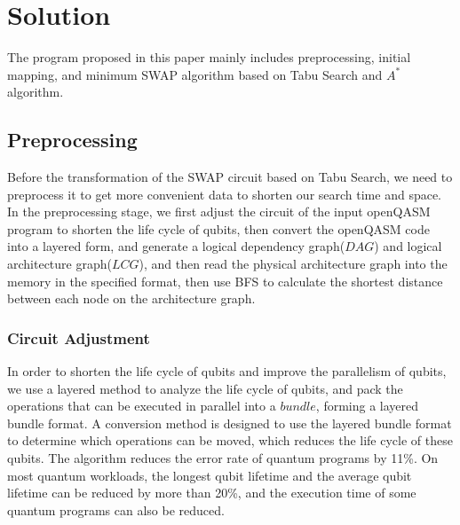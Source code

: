 \documentclass[runningheads]{llncs}
\begin{document}
\section{Solution}
\label{Solution}
The program proposed in this paper mainly includes preprocessing, 
initial mapping, 
and minimum SWAP algorithm based on Tabu Search and  $A^{*}$ algorithm.
\subsection{Preprocessing}
Before the transformation of the SWAP circuit based on Tabu Search, 
we need to preprocess it to get more convenient data to shorten our search time and space.
In the preprocessing stage, we first adjust the circuit of the input openQASM 
program to shorten the life cycle of qubits, then convert the openQASM code 
into a layered form, and generate a logical dependency graph($DAG$) and logical architecture graph($LCG$),
 and then read 
the physical architecture graph into the memory in the specified format, then use BFS to calculate 
the shortest distance between each node on the architecture graph.
\subsubsection{Circuit Adjustment}
In order to shorten the life cycle of qubits and improve the parallelism of qubits, 
we use a layered method \cite{2019Zhang} to analyze the life cycle of qubits, 
and pack the operations that can be executed in parallel into a $bundle$, forming a layered bundle format.
A conversion method is designed to use the layered bundle format to determine 
which operations can be moved, which reduces the life cycle of these qubits.
The algorithm reduces the error rate of quantum programs by 11\%. 
On most quantum workloads, the longest qubit lifetime and the average qubit lifetime 
can be reduced by more than 20\%, and the execution time of some quantum programs can also be reduced.
\end{document}
